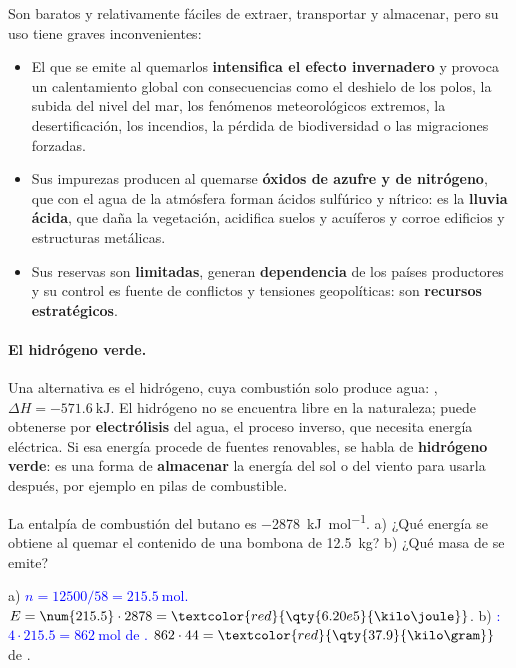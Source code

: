 Son baratos y relativamente fáciles de extraer, transportar y almacenar, pero su uso tiene graves inconvenientes:
\begin{itemize}
    \item El  que se emite al quemarlos \textbf{intensifica el efecto invernadero} y provoca un calentamiento global con
    consecuencias como el deshielo de los polos, la subida del nivel del mar, los fenómenos meteorológicos extremos, la
    desertificación, los incendios, la pérdida de biodiversidad o las migraciones forzadas.
    \item Sus impurezas producen al quemarse \textbf{óxidos de azufre y de nitrógeno}, que con el agua de la atmósfera forman ácidos
    sulfúrico y nítrico: es la \textbf{lluvia ácida}, que daña la vegetación, acidifica suelos y acuíferos y corroe edificios y
    estructuras metálicas.
    \item Sus reservas son \textbf{limitadas}, generan \textbf{dependencia} de los países productores y su control es fuente de
    conflictos y tensiones geopolíticas: son \textbf{recursos estratégicos}.
\end{itemize}

\paragraph{El hidrógeno verde.} Una alternativa es el hidrógeno, cuya combustión solo produce agua:
, \(\Delta H = \qty{-571.6}{\kilo\joule}\). El hidrógeno no se encuentra libre en la
naturaleza; puede obtenerse por \textbf{electrólisis} del agua, el proceso inverso, que necesita energía eléctrica. Si esa energía
procede de fuentes renovables, se habla de \textbf{hidrógeno verde}: es una forma de \textbf{almacenar} la energía del sol o del
viento para usarla después, por ejemplo en pilas de combustible.

\begin{exercise}
    La entalpía de combustión del butano es \qty{-2878}{\kilo\joule\per\mol}. a) ¿Qué energía se obtiene al quemar el contenido de
    una bombona de \qty{12.5}{\kilo\gram}? b) ¿Qué masa de  se emite?
    \begin{solu}
        a) \textcolor{blue}{\(n = 12500/58 = \qty{215.5}{\mol}\).} \(E = \num{215.5} \cdot 2878 = \textcolor{red}{\qty{6.20e5}{\kilo\joule}}\).
        b) \textcolor{blue}{: \(4 \cdot \num{215.5} = \qty{862}{\mol}\) de .}
        \(862 \cdot 44 = \textcolor{red}{\qty{37.9}{\kilo\gram}}\) de .
    \end{solu}
\end{exercise}

